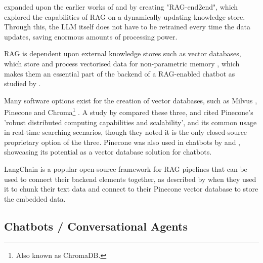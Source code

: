 \documentclass[12pt]{report}
\begin{document}
    \textcite{siriwardhana_improving_2023} expanded upon the earlier works of \textcite{karpukhin_dense_2020} and \textcite{lewis_pre-training_2020} by creating 
    "RAG-end2end", which explored the capabilities of RAG on a dynamically updating knowledge store. Through this, the LLM itself does not have to be retrained 
    every time the data updates, saving enormous amounts of processing power.
    
    RAG is dependent upon external knowledge stores such as vector databases, which store and process vectorised data
    for non-parametric memory \autocite{li_modernization_2023}, which makes them an essential part of the backend of 
    a RAG-enabled chatbot as studied by \textcite{odede_jaybot_2024}. 
    
    Many software options exist for the creation of 
    vector databases, such as Milvus \autocite{wang_milvus_2021}, Pinecone \autocite{pinecone_pinecone_nodate} and Chroma\footnote{Also known as ChromaDB.} \autocite{chroma_chroma_nodate}.
    A study by \textcite{xie_brief_2023} compared these three, and cited Pinecone's 'robust distributed computing capabilities and scalability', and its common usage 
    in real-time searching scenarios, though they noted it is the only closed-source proprietary option of the three.
    Pinecone was also used in chatbots by \textcite{odede_jaybot_2024} and \textcite{singer_development_2024}, showcasing its potential as a vector database solution
    for chatbots.

    LangChain \autocite{langchain_introduction_nodate} is a popular open-source framework for RAG pipelines that can be used to connect their backend elements 
    together, as described by \textcite{singer_development_2024} when they used it to chunk their text data and connect to their Pinecone vector database to store 
    the embedded data. 
    


    \subsection{Chatbots / Conversational Agents}
\end{document}
